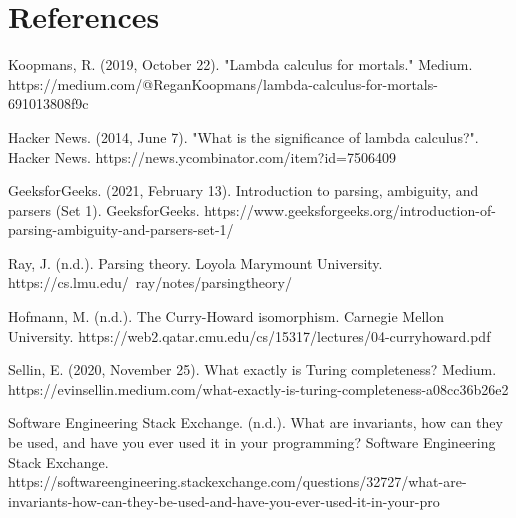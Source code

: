 \documentclass{article}
\theoremstyle{plain}
\theoremstyle{definition}
\theoremstyle{remark}
\begin{document}
\section{References}\label{references}

Koopmans, R. (2019, October 22). "Lambda calculus for mortals." Medium. https://medium.com/@ReganKoopmans/lambda-calculus-for-mortals-691013808f9c

Hacker News. (2014, June 7). "What is the significance of lambda calculus?". Hacker News. https://news.ycombinator.com/item?id=7506409

GeeksforGeeks. (2021, February 13). Introduction to parsing, ambiguity, and parsers (Set 1). GeeksforGeeks. https://www.geeksforgeeks.org/introduction-of-parsing-ambiguity-and-parsers-set-1/

Ray, J. (n.d.). Parsing theory. Loyola Marymount University. https://cs.lmu.edu/~ray/notes/parsingtheory/

Hofmann, M. (n.d.). The Curry-Howard isomorphism. Carnegie Mellon University. https://web2.qatar.cmu.edu/cs/15317/lectures/04-curryhoward.pdf

Sellin, E. (2020, November 25). What exactly is Turing completeness? Medium. https://evinsellin.medium.com/what-exactly-is-turing-completeness-a08cc36b26e2

Software Engineering Stack Exchange. (n.d.). What are invariants, how can they be used, and have you ever used it in your programming? Software Engineering Stack Exchange. https://softwareengineering.stackexchange.com/questions/32727/what-are-invariants-how-can-they-be-used-and-have-you-ever-used-it-in-your-pro
\end{document}
